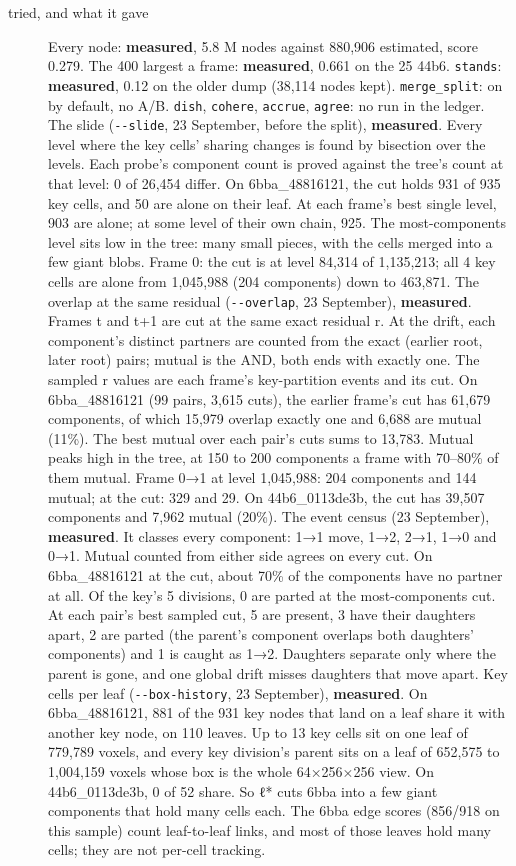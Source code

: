 \begin{description}
\item[{tried, and what it gave}] Every node: \textbf{measured}, 5.8 M nodes against 880,906 estimated, score 0.279. The 400 largest a frame: \textbf{measured}, 0.661 on the 25 44b6. \texttt{stands}: \textbf{measured}, 0.12 on the older dump (38,114 nodes kept). \texttt{merge\_\allowbreak{}split}: on by default, no A/B. \texttt{dish}, \texttt{cohere}, \texttt{accrue}, \texttt{agree}: no run in the ledger. The slide (\texttt{-\allowbreak{}-\allowbreak{}slide}, 23 September, before the split), \textbf{measured}. Every level where the key cells' sharing changes is found by bisection over the levels. Each probe's component count is proved against the tree's count at that level: 0 of 26,454 differ. On 6bba\_\allowbreak{}48816121, the cut holds 931 of 935 key cells, and 50 are alone on their leaf. At each frame's best single level, 903 are alone; at some level of their own chain, 925. The most-components level sits low in the tree: many small pieces, with the cells merged into a few giant blobs. Frame 0: the cut is at level 84,314 of 1,135,213; all 4 key cells are alone from 1,045,988 (204 components) down to 463,871. The overlap at the same residual (\texttt{-\allowbreak{}-\allowbreak{}overlap}, 23 September), \textbf{measured}. Frames t and t+1 are cut at the same exact residual r. At the drift, each component's distinct partners are counted from the exact (earlier root, later root) pairs; mutual is the AND, both ends with exactly one. The sampled r values are each frame's key-partition events and its cut. On 6bba\_\allowbreak{}48816121 (99 pairs, 3,615 cuts), the earlier frame's cut has 61,679 components, of which 15,979 overlap exactly one and 6,688 are mutual (11\%). The best mutual over each pair's cuts sums to 13,783. Mutual peaks high in the tree, at 150 to 200 components a frame with 70–80\% of them mutual. Frame 0→1 at level 1,045,988: 204 components and 144 mutual; at the cut: 329 and 29. On 44b6\_\allowbreak{}0113de3b, the cut has 39,507 components and 7,962 mutual (20\%). The event census (23 September), \textbf{measured}. It classes every component: 1→1 move, 1→2, 2→1, 1→0 and 0→1. Mutual counted from either side agrees on every cut. On 6bba\_\allowbreak{}48816121 at the cut, about 70\% of the components have no partner at all. Of the key's 5 divisions, 0 are parted at the most-components cut. At each pair's best sampled cut, 5 are present, 3 have their daughters apart, 2 are parted (the parent's component overlaps both daughters' components) and 1 is caught as 1→2. Daughters separate only where the parent is gone, and one global drift misses daughters that move apart. Key cells per leaf (\texttt{-\allowbreak{}-\allowbreak{}box-\allowbreak{}history}, 23 September), \textbf{measured}. On 6bba\_\allowbreak{}48816121, 881 of the 931 key nodes that land on a leaf share it with another key node, on 110 leaves. Up to 13 key cells sit on one leaf of 779,789 voxels, and every key division's parent sits on a leaf of 652,575 to 1,004,159 voxels whose box is the whole 64×256×256 view. On 44b6\_\allowbreak{}0113de3b, 0 of 52 share. So ℓ* cuts 6bba into a few giant components that hold many cells each. The 6bba edge scores (856/918 on this sample) count leaf-to-leaf links, and most of those leaves hold many cells; they are not per-cell tracking.

\end{description}
